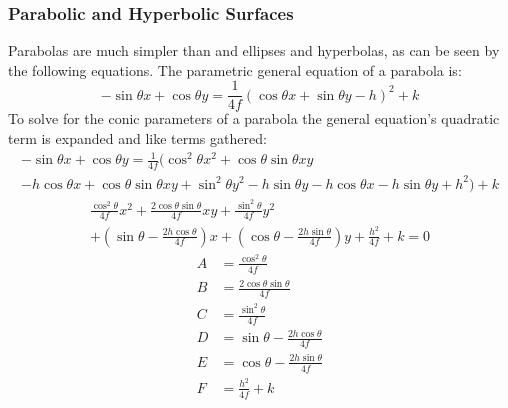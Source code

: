 \subsubsection{Parabolic and Hyperbolic Surfaces}
Parabolas are much simpler than and ellipses and hyperbolas, as can be seen by the following equations.
The parametric general equation of a parabola is:
\begin{equation}
	-\sin\theta x + \cos\theta y = \frac{1}{4f}(\cos\theta x + \sin\theta y - h)^2 + k
\end{equation}
To solve for the conic parameters of a parabola the general equation's quadratic term is expanded and like terms gathered:
\begin{multline*}
	-\sin\theta x + \cos\theta y = \frac{1}{4f}(\cos^2\theta x^2 + \cos\theta\sin\theta xy \\
	- h \cos\theta x + \cos\theta\sin\theta xy + \sin^2\theta y^2 - h\sin\theta y - h \cos\theta x - h \sin\theta y + h^2) + k
\end{multline*}
\begin{multline*}
	\frac{\cos^2\theta}{4f} x^2 + \frac{2\cos\theta\sin\theta}{4f} xy + \frac{\sin^2\theta}{4f} y^2 \\
	+ \left(\sin\theta - \frac{2h \cos\theta}{4f}\right)x + \left(\cos\theta - \frac{2h \sin\theta}{4f}\right)y + \frac{h^2}{4f} + k = 0
\end{multline*}
\begin{align}
	A &= \frac{\cos^2\theta}{4f} \\
	B &= \frac{2\cos\theta\sin\theta}{4f} \\
	C &= \frac{\sin^2\theta}{4f} \\
	D &= \sin\theta - \frac{2h \cos\theta}{4f} \\
	E &= \cos\theta - \frac{2h \sin\theta}{4f} \\
	F &= \frac{h^2}{4f} + k
\end{align}

